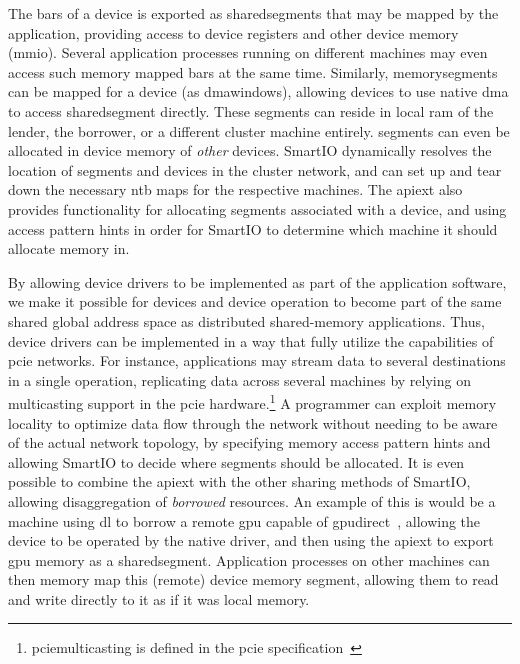 The \glspl{bar} of a device is exported as \glspl{sharedsegment} that may be mapped by the application, providing access to device registers and other device memory (\gls{mmio}).
%
Several application processes running on different machines may even access such memory mapped \glspl{bar} at the same time.
%
Similarly, \glspl{memorysegment} can be mapped for a device (as \glspl{dmawindow}), allowing devices to use native \gls{dma} to access \gls{sharedsegment} directly.
%
These \glspl{segment} can reside in local \gls{ram} of the \gls{lender}, the \gls{borrower}, or a different cluster machine entirely.
%
\Glspl{segment} can even be allocated in device memory of \emph{other} devices.
%
SmartIO dynamically resolves the location of \glspl{segment} and devices in the cluster network, and can set up and tear down the necessary \gls{ntb} maps for the respective machines.
%
The \gls{apiext} also provides functionality for allocating \glspl{segment} associated with a device, and using access pattern hints in order for SmartIO to determine which machine it should allocate memory in.



By allowing device drivers to be implemented as part of the application software, we make it possible for devices and device operation to become part of the same shared global address space as distributed shared-memory applications.
%
Thus, device drivers can be implemented in a way that fully utilize the capabilities of \gls{pcie} networks.
%
For instance, applications may stream data to several destinations in a single operation, replicating data across several machines by relying on \gls{multicasting} support in the \gls{pcie} hardware.\footnote{\gls{pciemulticasting} is defined in the \gls{pcie} specification~\cite{spec:PCIe}}
%
A programmer can exploit memory locality to optimize data flow through the network without needing to be aware of the actual network topology, by specifying memory access pattern hints and allowing SmartIO to decide where \glspl{segment} should be allocated.
%
It is even possible to combine the \gls{apiext} with the other sharing methods of SmartIO, allowing \gls{disaggregation} of \emph{borrowed} resources.
%
An example of this is would be a machine using \gls{dl} to borrow a remote \gls{gpu} capable of \gls{gpudirect}~\cite{url:GPUDirect,url:Rosetti2014}, allowing the device to be operated by the native driver, and then using the \gls{apiext} to export \gls{gpu} memory as a \gls{sharedsegment}.
%
Application processes on other machines can then memory map this (remote) device memory \gls{segment}, allowing them to read and write directly to it as if it was local memory.



